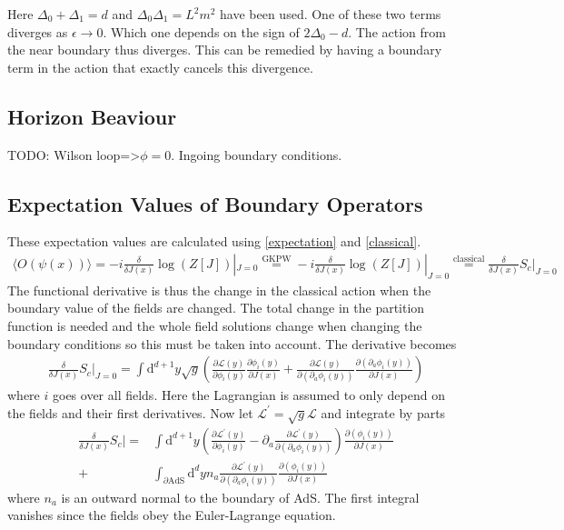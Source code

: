 \documentclass[12pt]{article}
\renewcommand{\d}{\ensuremath{\mathrm{d}}}
\renewcommand{\L}{\ensuremath{\mathcal{L}}}
\begin{document}
Here $\Delta_0+\Delta_1=d$ and $\Delta_0\Delta_1=L^2m^2$ have been used. One of these two terms diverges as $\epsilon\rightarrow0$. Which one depends on the sign of $2\Delta_0-d$.
The action from the near boundary thus diverges. This can be remedied by having a boundary term in the action that exactly cancels this divergence. 
\subsection{Horizon Beaviour}
TODO: Wilson loop=>$\phi=0$. Ingoing boundary conditions.
\subsection{Expectation Values of Boundary Operators}
These expectation values are calculated using \eqref{expectation} and \eqref{classical}.
\begin{equation}
\begin{split}
\langle O(\psi(x))\rangle\label{expectation}=-i\frac{\delta}{\delta J(x)}\log(Z[J])|_{J=0}\stackrel{\mathrm{GKPW}}{=}-i\frac{\delta}{\delta J(x)}\log(Z[J])|_{J=0}\stackrel{\mathrm{classical}}{=}\frac{\delta}{\delta J(x)}S_c|_{J=0}
\end{split}
\end{equation}
The functional derivative is thus the change in the classical action when the boundary value of the fields are changed. The total change in the partition function is needed and the whole field solutions change when changing the boundary conditions so this must be taken into account. The derivative becomes
\begin{equation}
\begin{split}
\frac{\delta}{\delta J(x)}S_c|_{J=0}=\int \d^{d+1}y\sqrt{g}\left(\frac{\partial\L(y)}{\partial \phi_i(y)}\frac{\partial \phi_i(y)}{\partial J(x)}+\frac{\partial\L(y)}{\partial (\partial_a\phi_i(y))}\frac{\partial (\partial_a\phi_i(y))}{\partial J(x)}\right)
\end{split}
\end{equation}
where $i$ goes over all fields. Here the Lagrangian is assumed to only depend on the fields and their first derivatives. Now let $\L^\prime=\sqrt{g}\L$ and integrate by parts
\begin{equation}
\begin{split}
\frac{\delta}{\delta J(x)}S_c|=&\int \d^{d+1}y\left(\frac{\partial\L^\prime(y)}{\partial \phi_i(y)}-\partial_a\frac{\partial\L^\prime(y)}{\partial (\partial_a\phi_i(y))}\right)\frac{\partial (\phi_i(y))}{\partial J(x)}\\
+&\int_{\partial\mathrm{AdS}} \d^{d}yn_a\frac{\partial\L^\prime(y)}{\partial (\partial_a\phi_i(y))}\frac{\partial (\phi_i(y))}{\partial J(x)}
\end{split}
\end{equation}
where $n_a$ is an outward normal to the boundary of AdS.
The first integral vanishes since the fields obey the Euler-Lagrange equation.
\end{document}
